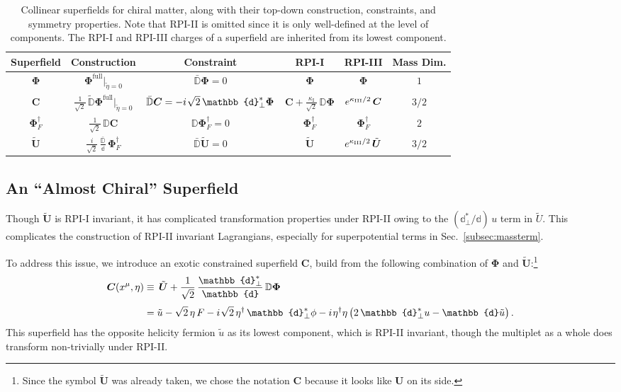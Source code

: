 \documentclass[12pt,document,nofootinbib,superscriptaddress,onecolumn,preprintnumbers,balancelastpage]{article}
\newcommand{\rpii}{{\kappa_\text{I}}}
\newcommand{\full}{\text{full}}
\newcommand{\s}{\hspace{0.8pt}}
\newcommand{\PP}{\mathbb{d}}
\DeclareRobustCommand{\Sec}[1]{Sec.~\ref{#1}}
\newcommand{\bPhi}{ \boldsymbol \Phi}
\newcommand{\bPhiF}{ \boldsymbol{\Phi}_F}
\newcommand{\bC}{ \boldsymbol C}
\newcommand{\bU}{ \tilde{\boldsymbol U}}
\newcommand{\D}{\mathbb{D}}
\newcommand{\uu}{\tilde u}
\begin{document}
\begin{spacing}{1.2}
\begin{table}[t]
\renewcommand{\arraystretch}{2}
\setlength{\arrayrulewidth}{.3mm}
\centering
\small
\setlength{\tabcolsep}{0.5 em}
\begin{tabular}{ |c || c | c | c | c | c |}
    \hline
    Superfield &  Construction & Constraint & RPI-I &   RPI-III  & Mass Dim. \\
    \hline \hline
  $ \bPhi $ & $\bPhi^{\full}|_{\tilde{\eta} = 0}$ & $\bar{\D} \bPhi = 0$ &  $\bPhi$ &   $  \bPhi $     &  $1$  \\
    $\bC $ & $\frac{1}{\sqrt{2}}\, \tilde{\D} \bPhi^{\full}|_{\tilde{\eta} = 0}$ & $\bar{\D} \bC = -i\s\sqrt{2}\, \PP_\perp^* \bPhi$ &    $\bC+   \frac{\rpii}{\sqrt{2}} \, \D \bPhi$  &  $e^{\kappa_{\rm III} /2}\, \bC $     &  $3/2$   \\ 
    $\bPhiF^\dagger $ & $ \frac{1}{\sqrt{2}}\, \D \bC$ & $\D \bPhiF^\dagger =0$ &    $\bPhiF^\dagger $  &  $\bPhiF^\dagger $     &  $2$  \\ 
     $\bU $ & $\frac{ i}{\sqrt{2}}\,\frac{\bar{\D}}{ \PP}\,  \bPhiF^\dagger $ & $\bar{\D} \bU = 0$ &    $\bU$  &  $e^{\kappa_{\rm III}/2} \,\bU$     &  $3/2$  \\[4pt]
       \hline 
\end{tabular}
\caption{
%
Collinear superfields for chiral matter, along with their top-down construction, constraints, and symmetry properties.
%
Note that RPI-II is omitted since it is only well-defined at the level of components.
%
The RPI-I and RPI-III charges of a superfield are inherited from its lowest component.
}
\label{table:RPIsuperfieldsChiral}
\end{table}

\subsection{An ``Almost Chiral'' Superfield}
\label{subsec:exoticconstrained}
Though $\bU$ is RPI-I invariant, it has complicated transformation properties under RPI-II owing to the $(\PP_\perp^* / \PP)\, u$ term in $\tilde{U}$.
%
This complicates the construction of RPI-II invariant Lagrangians, especially for superpotential terms in \Sec{subsec:massterm}.


To address this issue, we introduce an exotic constrained superfield $\bC$, build from the following combination of $\bPhi$ and $\bU$:\footnote{\footnotesize{Since the symbol $\bU$ was already taken, we chose the notation $\bC$ because it looks like $\boldsymbol{U}$ on its side.}}
%
\begin{align}
\bC (x^\mu, \eta) &\equiv  \, \bU + \frac{1}{\sqrt{2}}\, \frac{\PP_\perp^*}{\PP}\, \D \bPhi \nonumber\\[3pt]
& =    \uu - \sqrt{2}\, \eta\, F - i\s\sqrt{2}\, \eta^\dagger\, \PP_\perp^* \phi - i\s \eta^\dagger \eta\, \big( 2\, \PP_\perp^* u - \PP \uu \big) \,.
\label{eq:Cfield_def}
\end{align}
%
%
This superfield has the opposite helicity fermion $\tilde{u}$ as its lowest component, which is RPI-II invariant, though the multiplet as a whole does transform non-trivially under RPI-II.



\end{spacing}
\end{document}
